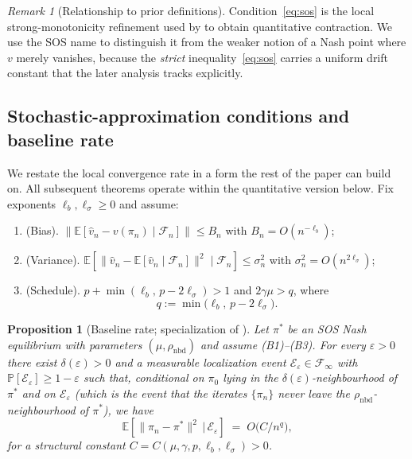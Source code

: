 \documentclass{article}
\theoremstyle{plain}
\newtheorem{proposition}[theorem]{Proposition}
\theoremstyle{definition}
\theoremstyle{remark}
\newtheorem{remark}[theorem]{Remark}
\newcommand{\E}{\mathbb{E}}
\begin{document}
\begin{remark}[Relationship to prior definitions]
Condition~\eqref{eq:sos} is the local strong-monotonicity refinement used by \citet{giannou2022convergence} to obtain quantitative contraction. We use the SOS name to distinguish it from the weaker notion of a Nash point where $v$ merely vanishes, because the \emph{strict} inequality~\eqref{eq:sos} carries a uniform drift constant that the later analysis tracks explicitly.
\end{remark}

\subsection{Stochastic-approximation conditions and baseline rate}

We restate the local convergence rate in a form the rest of the paper can build on. All subsequent theorems operate within the quantitative version below. Fix exponents $\ell_b,\ell_\sigma\ge 0$ and assume:
\begin{enumerate}[label=\textup{(B\arabic*)},leftmargin=1.8em,itemsep=0.2em]
  \item \textup{(Bias).} $\|\E[\hat v_n-v(\pi_n)\mid\mathcal{F}_n]\|\le B_n$ with $B_n = O(n^{-\ell_b})$;
  \item \textup{(Variance).} $\E\!\left[\|\hat v_n-\E[\hat v_n\mid\mathcal{F}_n]\|^2\mid\mathcal{F}_n\right]\le \sigma_n^2$ with $\sigma_n^2 = O(n^{2\ell_\sigma})$;
  \item \textup{(Schedule).} $p+\min(\ell_b,\,p-2\ell_\sigma)>1$ and $2\gamma\mu>q$, where
  \[
    q := \min\!\bigl(\ell_b,\,p-2\ell_\sigma\bigr).
  \]
\end{enumerate}

\begin{proposition}[Baseline rate; specialization of {\citealp[Thm.\,1]{giannou2022convergence}}]\label{prop:giannou}
Let $\pi^\ast$ be an SOS Nash equilibrium with parameters $(\mu,\rho_{\mathrm{nbd}})$ and assume \textup{(B1)--(B3)}. For every $\varepsilon>0$ there exist $\delta(\varepsilon)>0$ and a measurable localization event $\mathcal{E}_\varepsilon\in\mathcal{F}_\infty$ with $\mathbb{P}[\mathcal{E}_\varepsilon]\ge 1-\varepsilon$ such that, conditional on $\pi_0$ lying in the $\delta(\varepsilon)$-neighbourhood of $\pi^\ast$ and on $\mathcal{E}_\varepsilon$ (which is the event that the iterates $\{\pi_n\}$ never leave the $\rho_{\mathrm{nbd}}$-neighbourhood of $\pi^\ast$), we have
\begin{equation}\label{eq:giannou}
\E\!\left[\|\pi_n-\pi^\ast\|^2 \,\big|\, \mathcal{E}_\varepsilon\right] \;=\; O\!\bigl(C/n^q\bigr),
\end{equation}
for a structural constant $C=C(\mu,\gamma,p,\ell_b,\ell_\sigma)>0$.
\end{proposition}
\end{document}
